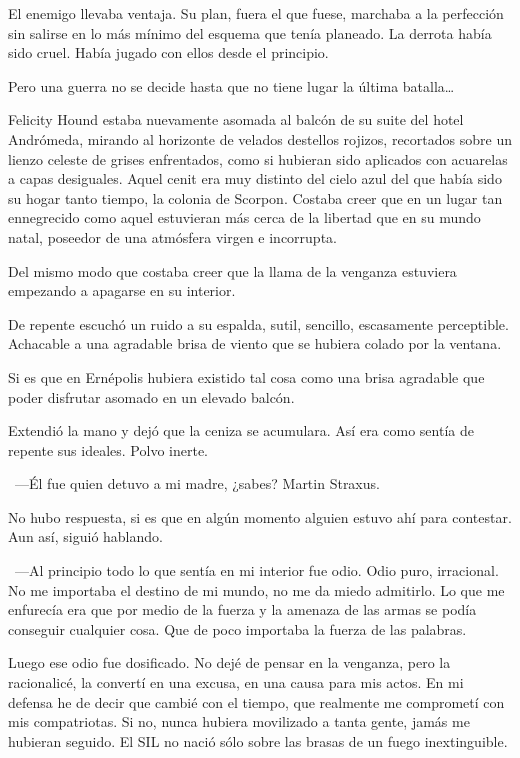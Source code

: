 \noindent
El enemigo llevaba ventaja. Su plan, fuera el que fuese, marchaba a la perfección sin salirse en lo más mínimo del esquema que tenía planeado. La derrota había sido cruel. Había jugado con ellos desde el principio.

Pero una guerra no se decide hasta que no tiene lugar la última batalla\dots

\parbreak\noindent
Felicity Hound estaba nuevamente asomada al balcón de su suite del hotel Andrómeda, mirando al horizonte de velados destellos rojizos, recortados sobre un lienzo celeste de grises enfrentados, como si hubieran sido aplicados con acuarelas a capas desiguales. Aquel cenit era muy distinto del cielo azul del que había sido su hogar tanto tiempo, la colonia de Scorpon. Costaba creer que en un lugar tan ennegrecido como aquel estuvieran más cerca de la libertad que en su mundo natal, poseedor de una atmósfera virgen e incorrupta.

Del mismo modo que costaba creer que la llama de la venganza estuviera empezando a apagarse en su interior.

De repente escuchó un ruido a su espalda, sutil, sencillo, escasamente perceptible. Achacable a una agradable brisa de viento que se hubiera colado por la ventana.

Si es que en Ernépolis hubiera existido tal cosa como una brisa agradable que poder disfrutar asomado en un elevado balcón.

Extendió la mano y dejó que la ceniza se acumulara. Así era como sentía de repente sus ideales. Polvo inerte.

~---Él fue quien detuvo a mi madre, ¿sabes? Martin Straxus.

No hubo respuesta, si es que en algún momento alguien estuvo ahí para contestar. Aun así, siguió hablando.

~---Al principio todo lo que sentía en mi interior fue odio. Odio puro, irracional. No me importaba el destino de mi mundo, no me da miedo admitirlo. Lo que me enfurecía era que por medio de la fuerza y la amenaza de las armas se podía conseguir cualquier cosa. Que de poco importaba la fuerza de las palabras.

\rquoti Luego ese odio fue dosificado. No dejé de pensar en la venganza, pero la racionalicé, la convertí en una excusa, en una causa para mis actos. En mi defensa he de decir que cambié con el tiempo, que realmente me comprometí con mis compatriotas. Si no, nunca hubiera movilizado a tanta gente, jamás me hubieran seguido. El SIL no nació sólo sobre las brasas de un fuego inextinguible.

